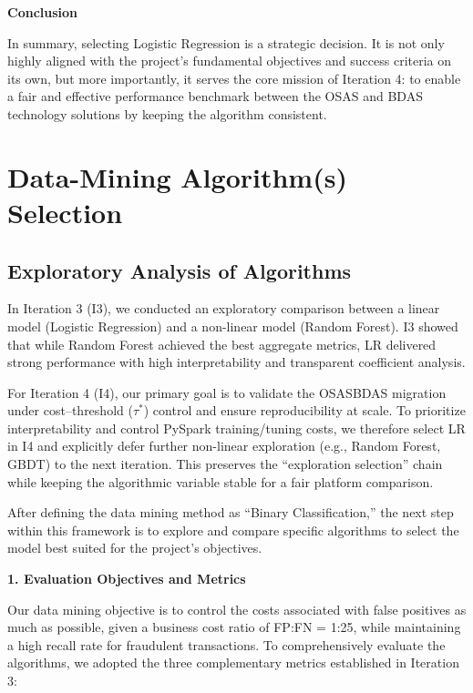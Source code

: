 \documentclass[sigplan,screen]{acmart}
\begin{document}
\textbf{Conclusion}

In summary, selecting Logistic Regression is a strategic decision. It is not only highly aligned with the project's fundamental objectives and success criteria on its own, but more importantly, it serves the core mission of Iteration 4: to enable a fair and effective performance benchmark between the OSAS and BDAS technology solutions by keeping the algorithm consistent.

\section{Data-Mining Algorithm(s) Selection}

\subsection{Exploratory Analysis of Algorithms}

In Iteration 3 (I3), we conducted an exploratory comparison between a linear model (Logistic Regression) and a non-linear model (Random Forest). I3 showed that while Random Forest achieved the best aggregate metrics, LR delivered strong performance with high interpretability and transparent coefficient analysis.

For Iteration 4 (I4), our primary goal is to validate the OSAS\textrightarrow{}BDAS migration under cost--threshold ($\tau^*$) control and ensure reproducibility at scale. To prioritize interpretability and control PySpark training/tuning costs, we therefore select LR in I4 and explicitly defer further non-linear exploration (e.g., Random Forest, GBDT) to the next iteration. This preserves the \textquotedblleft exploration \textrightarrow{} selection\textquotedblright{} chain while keeping the algorithmic variable stable for a fair platform comparison.

After defining the data mining method as ``Binary Classification,'' the next step within this framework is to explore and compare specific algorithms to select the model best suited for the project's objectives.

\textbf{1. Evaluation Objectives and Metrics}

Our data mining objective is to control the costs associated with false positives as much as possible, given a business cost ratio of FP:FN = 1:25, while maintaining a high recall rate for fraudulent transactions. To comprehensively evaluate the algorithms, we adopted the three complementary metrics established in Iteration 3:
\end{document}
